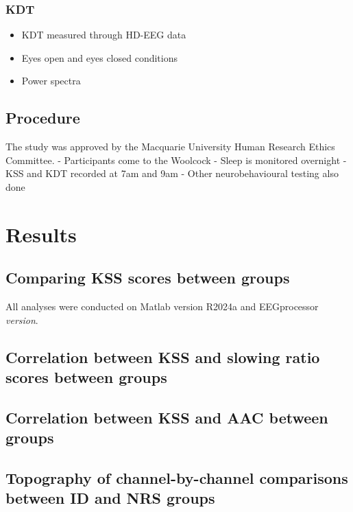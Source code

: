 \documentclass[12pt,a4paper,]{report}
\providecommand{\tightlist}{%
  \setlength{\itemsep}{0pt}\setlength{\parskip}{0pt}}
\begin{document}
\subsection{KDT}\label{kdt-1}

\begin{itemize}
\tightlist
\item
  KDT measured through HD-EEG data
\item
  Eyes open and eyes closed conditions
\item
  Power spectra
\end{itemize}

\section{Procedure}\label{procedure-1}

The study was approved by the Macquarie University Human Research Ethics
Committee. - Participants come to the Woolcock - Sleep is monitored
overnight - KSS and KDT recorded at 7am and 9am - Other neurobehavioural
testing also done

\newpage

\chapter{Results}\label{sec:results}

\section{Comparing KSS scores between
groups}\label{comparing-kss-scores-between-groups-1}

All analyses were conducted on Matlab version R2024a and EEGprocessor
\emph{version}.

\section{Correlation between KSS and slowing ratio scores between
groups}\label{correlation-between-kss-and-slowing-ratio-scores-between-groups-1}

\section{Correlation between KSS and AAC between
groups}\label{correlation-between-kss-and-aac-between-groups-1}

\section{Topography of channel-by-channel comparisons between ID and NRS
groups}\label{topography-of-channel-by-channel-comparisons-between-id-and-nrs-groups-1}
\end{document}
